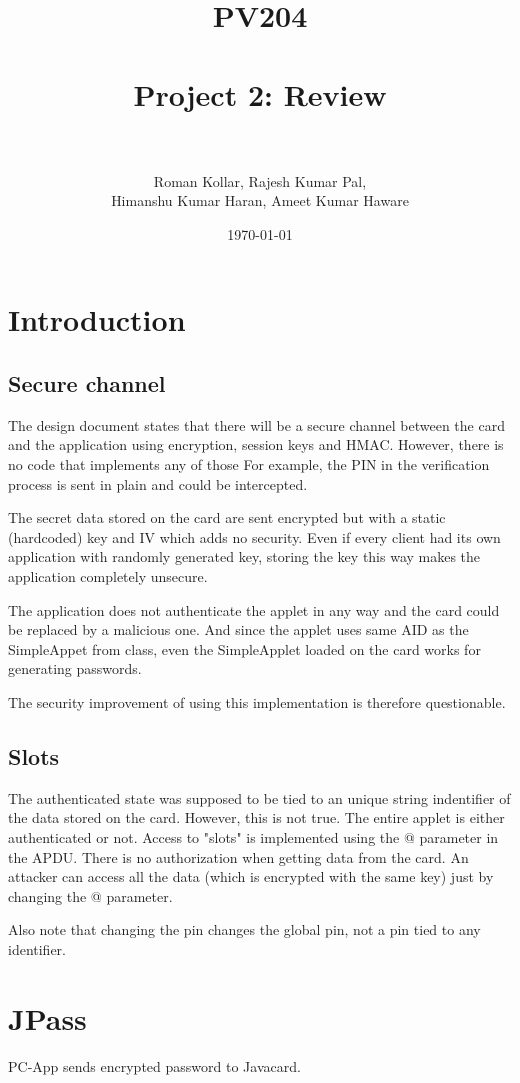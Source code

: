 \documentclass[paper=a4, fontsize=12pt]{scrartcl}
\title{
\normalfont \normalsize
\textsc{PV204} \\ [25pt]
\horrule{0.5pt} \\[0.4cm]
\huge Project 2: Review  \\
\horrule{2pt} \\[0.5cm]
}
\author{Roman Kollar, Rajesh Kumar Pal,\\Himanshu Kumar Haran, Ameet Kumar Haware}
\date{\normalsize\today}
\begin{document}
\maketitle

\section{Introduction}
\subsection{Secure channel}
The design document states that there will be a secure channel between the card and the application using encryption, session keys and HMAC.
However, there is no code that implements any of those
For example, the PIN in the verification process is sent in plain and could be intercepted.

The secret data stored on the card are sent encrypted but with a static (hardcoded) key and IV which adds no security.
Even if every client had its own application with randomly generated key, storing the key this way makes the application completely unsecure.

The application does not authenticate the applet in any way and the card could be replaced by a malicious one.
And since the applet uses same AID as the SimpleAppet from class, even the SimpleApplet loaded on the card works for generating passwords.

The security improvement of using this implementation is therefore questionable.

\subsection{Slots}
The authenticated state was supposed to be tied to an unique string indentifier of the data stored on the card.
However, this is not true.
The entire applet is either authenticated or not.
Access to "slots" is implemented using the @ parameter in the APDU.
There is no authorization when getting data from the card.
An attacker can access all the data (which is encrypted with the same key) just by changing the @ parameter.

Also note that changing the pin changes the global pin, not a pin tied to any identifier.

\section{JPass}
PC-App sends encrypted password to Javacard. %
\end{document}
